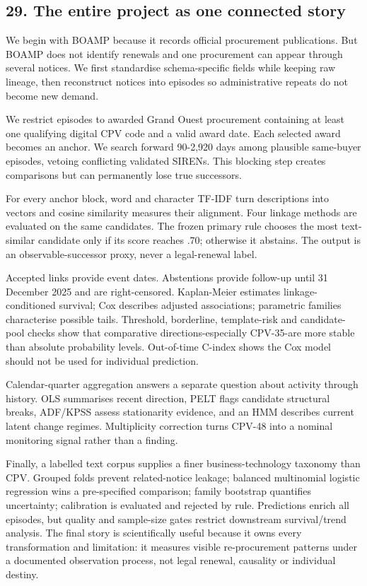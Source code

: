 \subsection{29. The entire project as one connected
story}\label{29-the-entire-project-as-one-connected-story}

We begin with BOAMP because it records official procurement
publications. But BOAMP does not identify renewals and one procurement
can appear through several notices. We first standardise schema-specific
fields while keeping raw lineage, then reconstruct notices into episodes
so administrative repeats do not become new demand.

We restrict episodes to awarded Grand Ouest procurement containing at
least one qualifying digital CPV code and a valid award date. Each
selected award becomes an anchor. We search forward 90-2,920 days among
plausible same-buyer episodes, vetoing conflicting validated SIRENs.
This blocking step creates comparisons but can permanently lose true
successors.

For every anchor block, word and character TF-IDF turn descriptions into
vectors and cosine similarity measures their alignment. Four linkage
methods are evaluated on the same candidates. The frozen primary rule
chooses the most text-similar candidate only if its score reaches .70;
otherwise it abstains. The output is an observable-successor proxy,
never a legal-renewal label.

Accepted links provide event dates. Abstentions provide follow-up until
31 December 2025 and are right-censored. Kaplan-Meier estimates
linkage-conditioned survival; Cox describes adjusted associations;
parametric families characterise possible tails. Threshold, borderline,
template-risk and candidate-pool checks show that comparative
directions-especially CPV-35-are more stable than absolute probability
levels. Out-of-time C-index shows the Cox model should not be used for
individual prediction.

Calendar-quarter aggregation answers a separate question about activity
through history. OLS summarises recent direction, PELT flags candidate
structural breaks, ADF/KPSS assess stationarity evidence, and an HMM
describes current latent change regimes. Multiplicity correction turns
CPV-48 into a nominal monitoring signal rather than a finding.

Finally, a labelled text corpus supplies a finer business-technology
taxonomy than CPV. Grouped folds prevent related-notice leakage;
balanced multinomial logistic regression wins a pre-specified
comparison; family bootstrap quantifies uncertainty; calibration is
evaluated and rejected by rule. Predictions enrich all episodes, but
quality and sample-size gates restrict downstream survival/trend
analysis. The final story is scientifically useful because it owns every
transformation and limitation: it measures visible re-procurement
patterns under a documented observation process, not legal renewal,
causality or individual destiny.

